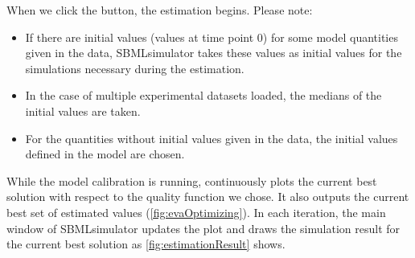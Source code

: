 When we click the  button, the estimation begins.
Please note:
\begin{itemize}
  \item If there are initial values (\ie values at time point 0) for some model quantities given in the data, SBMLsimulator takes these values as initial values for the simulations necessary during the estimation.
  \item In the case of multiple experimental datasets loaded, the medians of the initial values are taken.
  \item For the quantities without initial values given in the data, the initial values defined in the model are chosen.
\end{itemize}

While the model calibration is running, \EvA continuously plots the current best solution with respect to the quality function we chose.
It also outputs the current best set of estimated values (\cref{fig:evaOptimizing}).
In each iteration, the main window of SBMLsimulator updates the plot and draws the simulation result for the current best solution as \cref{fig:estimationResult} shows.


